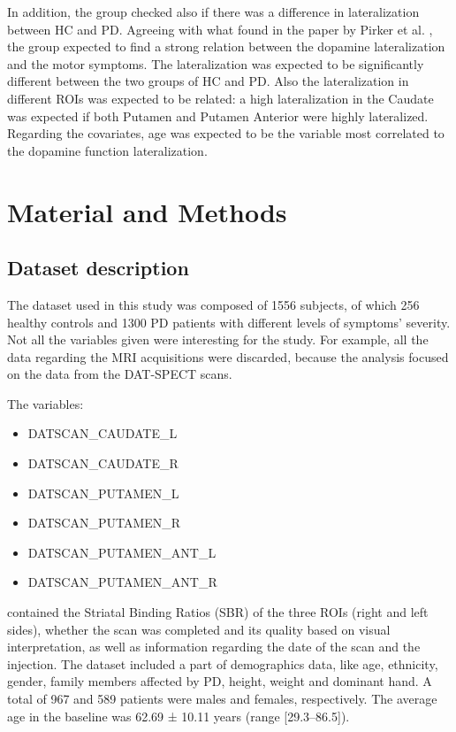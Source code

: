 \documentclass[]{article}
\begin{document}
\begin{multicols}{2}
In addition, the group checked also if there was a difference in lateralization between HC and PD. 
\newline
Agreeing with what found in the paper by Pirker et al. \cite{pirker_correlation_2003}, the group expected to find a strong relation between the dopamine lateralization and the motor symptoms. The lateralization was expected to be significantly different between the two groups of HC and PD. Also the lateralization in different ROIs was expected to be related: a high lateralization in the Caudate was expected if both Putamen and Putamen Anterior were highly lateralized. Regarding the covariates, age was expected to be the variable most correlated to the dopamine function lateralization.

\section{Material and Methods}

\subsection{Dataset description}
The dataset used in this study was composed of 1556 subjects, of which 256 healthy controls and 1300 PD patients with different levels of symptoms' severity. Not all the variables given were interesting for the study. For example, all the data regarding the MRI acquisitions were discarded, because the analysis focused on the data from the DAT-SPECT scans.

The variables:
\begin{itemize}
	\item DATSCAN\_CAUDATE\_L
	\item DATSCAN\_CAUDATE\_R
	\item DATSCAN\_PUTAMEN\_L
	\item DATSCAN\_PUTAMEN\_R
	\item DATSCAN\_PUTAMEN\_ANT\_L
	\item DATSCAN\_PUTAMEN\_ANT\_R
\end{itemize}
contained the Striatal Binding Ratios (SBR) of the three ROIs (right and left sides), whether the scan was completed and its quality based on visual interpretation, as well as information regarding the date of the scan and the injection. 
\newline
The dataset included a part of demographics data, like age, ethnicity, gender, family members affected by PD, height, weight and dominant hand.
A total of 967 and 589 patients were males and females, respectively. The average age in the baseline was 62.69 ± 10.11 years (range [29.3–86.5]). 


\end{multicols}
\end{document}
